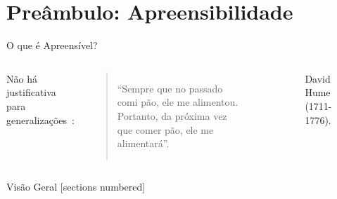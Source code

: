 \documentclass[10pt, professionalfonts]{beamer}
\begin{document}
{
\AtBeginSection{}
\section{Preâmbulo: Apreensibilidade}
\begin{frame}{O que é Apreensível?}
 
\begin{columns}[c]
Não há justificativa para generalizações~\cite{Hume2009Tratado}: 
\begin{quotation}
  ``Sempre que no passado comi pão, ele me alimentou. Portanto, da próxima vez que comer pão, ele me alimentará''.
\end{quotation}~\cite{hume2004investigacoes}
  \centering 
  \begin{figure}
    \label{hume}
    \caption{David Hume (1711-1776).}
  \end{figure} 
\end{columns}
\end{frame}
}
\begin{frame}{Visão Geral}
  [sections numbered]
  \tableofcontents[hideallsubsections]
\end{frame}
\end{document}
